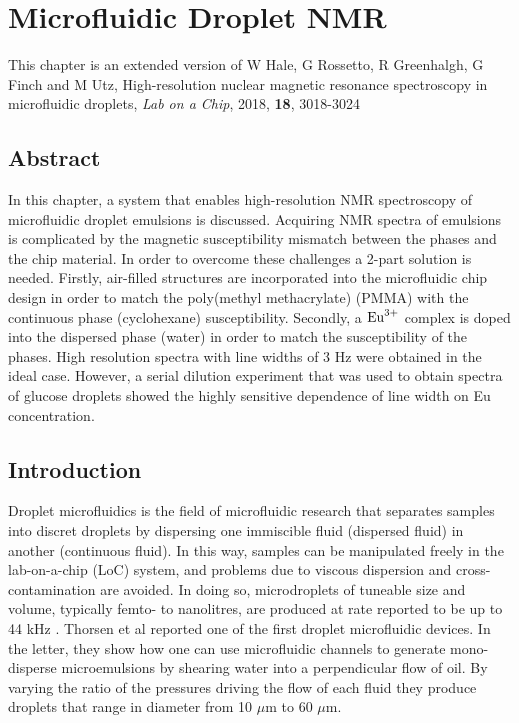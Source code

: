 
\chapter{Microfluidic Droplet NMR}\label{Chapter:Droplets}

This chapter is an extended version of W Hale, G Rossetto, R Greenhalgh, G Finch and M Utz, High-resolution
nuclear magnetic resonance spectroscopy in microfluidic droplets, \textit{Lab on a Chip}, 2018, \textbf{18}, 3018-3024 \citep{Hale:2018fv}

\section{Abstract}

In this chapter, a system that enables high-resolution NMR spectroscopy of microfluidic droplet
emulsions is discussed. Acquiring NMR spectra of emulsions is complicated by the magnetic
susceptibility mismatch between the phases and the chip material. In order to overcome these challenges a
2-part solution is needed. Firstly, air-filled structures are incorporated into the microfluidic chip design in order
to match the poly(methyl methacrylate) (PMMA) with the continuous phase (cyclohexane) susceptibility. Secondly, a $\ce{Eu^{3+}}$
complex is doped into the dispersed phase (water) in order to match the susceptibility of
the phases. High resolution spectra with line widths of 3 Hz were obtained in the ideal case.
However, a serial dilution experiment that was used to obtain spectra of glucose droplets showed
the highly sensitive dependence of line width on Eu concentration.

\section{Introduction}

Droplet microfluidics is the field of microfluidic research that separates samples into discret droplets by dispersing one
immiscible fluid (dispersed fluid) in another (continuous fluid). In this way, samples can be manipulated freely in the lab-on-a-chip (LoC) system,
and problems due to viscous dispersion and cross-contamination
are avoided. In doing so, microdroplets of tuneable size and volume,
typically femto- to nanolitres, are produced at rate reported to be up to 44 kHz \citep{RN115}. Thorsen et al \citep{RN104}
reported one of the first droplet microfluidic devices. In the letter, they show how one can use microfluidic channels to
generate mono-disperse microemulsions by shearing water into a perpendicular flow of oil. By varying the ratio of the pressures
driving the flow of each fluid they produce droplets that range in diameter from 10 $\mu\text{m}$ to 60 $\mu\text{m}$.

